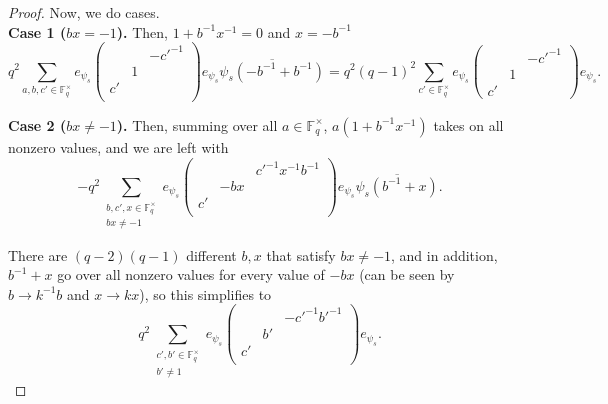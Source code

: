 \documentclass[12pt,reqno]{amsart}
\theoremstyle{definition}
\theoremstyle{remark}
\numberwithin{equation}{section}
\begin{document}
\begin{proof}
    Now, we do cases.\\

    \textbf{Case 1 ($bx = -1$).} Then, $1+b^{-1}x^{-1} = 0$ and $x = -b^{-1}$
    \begin{equation*}
        q^2 \sum_{a, b, c' \in \mathbb{F}_q^\times}e_{\psi_s} \begin{pmatrix}
            & & -c'^{-1}\\
            & 1 & \\
            c' & &\\
        \end{pmatrix} e_{\psi_s} \overline{\psi_s(-b^{-1}+b^{-1})} = q^2(q-1)^2 \sum_{c'\in \mathbb{F}_q^\times} e_{\psi_s} \begin{pmatrix}
            & & -c'^{-1}\\
            & 1 &\\
            c' & &
        \end{pmatrix}
        e_{\psi_s}.
    \end{equation*}

    \textbf{Case 2 ($bx \ne -1$).} Then, summing over all $a \in \mathbb{F}_q^\times$, $a(1+b^{-1}x^{-1})$ takes on all nonzero values, and we are left with
    \begin{equation*}
        -q^2 \sum_{\substack{b, c', x \in \mathbb{F}_q^\times\\bx \ne -1}}e_{\psi_s} \begin{pmatrix}
            & & c'^{-1}x^{-1}b^{-1}\\
            & -bx & \\
            c' & &\\
        \end{pmatrix} e_{\psi_s} \overline{\psi_s(b^{-1}+x)}.
    \end{equation*}

    There are $(q-2)(q-1)$ different $b, x$ that satisfy $bx \ne -1$, and in addition, $b^{-1}+x$ go over all nonzero values for every value of $-bx$ (can be seen by $b \to k^{-1}b$ and $x \to kx$), so this simplifies to
    \begin{equation*}
        q^2 \sum_{\substack{c', b' \in \mathbb{F}_q^\times\\b' \ne 1}}e_{\psi_s} \begin{pmatrix}
            & & -c'^{-1}b'^{-1}\\
            & b' & \\
            c' & &\\
        \end{pmatrix} e_{\psi_s}.
    \end{equation*}


\end{proof}
\end{document}
